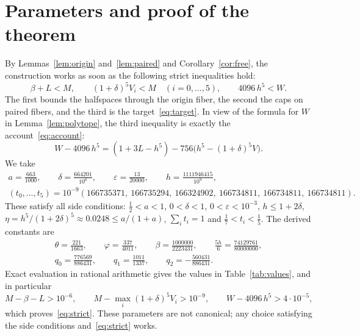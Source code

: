 \documentclass[11pt]{article}
\newcommand{\1}{\mathbf{1}}
\begin{document}
\section{Parameters and proof of the theorem}\label{sec:proof}

By Lemmas~\ref{lem:origin} and~\ref{lem:paired} and Corollary~\ref{cor:free}, the construction works as soon as the following
strict inequalities hold:
\begin{equation}\label{eq:strict}
\beta+L<M,\qquad(1+\delta)^5V_i<M\quad(i=0,\ldots,5),\qquad4096\,h^5<W.
\end{equation}
The first bounds the halfspaces through the origin fiber, the second the caps on paired fibers, and the third is the
target~\eqref{eq:target}. In view of the formula for $W$ in Lemma~\ref{lem:polytope}, the third inequality is exactly the
account~\eqref{eq:account}:
\[
W-4096\,h^5=(1+3L-h^5)-756\bigl(h^5-(1+\delta)^5V\bigr).
\]
We take
\begin{gather*}
a=\frac{663}{1000},\qquad\delta=\frac{664201}{10^6},\qquad\varepsilon=\frac{13}{20000},\qquad h=\frac{1111946415}{10^9},\\
(t_0,\ldots,t_5)=10^{-9}(166735371,\ 166735294,\ 166324902,\ 166734811,\ 166734811,\ 166734811).
\end{gather*}
These satisfy all side conditions: $\frac12<a<1$, $0<\delta<1$, $0<\varepsilon<10^{-3}$, $h\le1+2\delta$,
$\eta=h^5/(1+2\delta)^5\approx0.0248\le a/(1+a)$, $\sum_it_i=1$ and $\frac17<t_i<\frac15$. The derived constants are
\begin{gather*}
\theta=\tfrac{221}{1663},\qquad\varphi=\tfrac{337}{4011},\qquad\beta=\tfrac{1000000}{2223431},\qquad
\tfrac{5h}{6}=\tfrac{74129761}{80000000},\\
q_0=\tfrac{776569}{886431},\qquad q_1=\tfrac{1011}{1337},\qquad q_2=-\tfrac{560431}{886431}.
\end{gather*}
Exact evaluation in rational arithmetic gives the values in Table~\ref{tab:values}, and in particular
\[
M-\beta-L>10^{-6},\qquad M-\max_i(1+\delta)^5V_i>10^{-9},\qquad W-4096\,h^5>4\cdot10^{-5},
\]
which proves~\eqref{eq:strict}. These parameters are not canonical; any choice satisfying the side conditions
and~\eqref{eq:strict} works.
\end{document}
